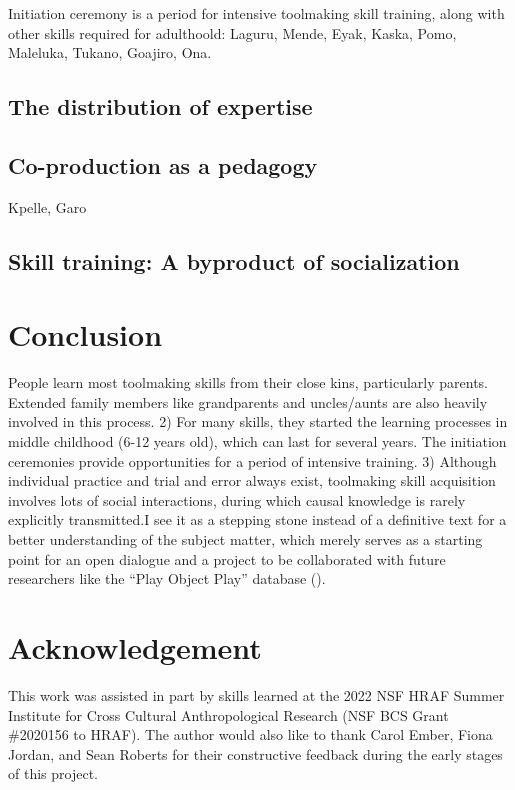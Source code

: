 \documentclass[
  11pt,
]{article}
\begin{document}
Initiation ceremony is a period for intensive toolmaking skill training, along with other skills required for adulthoold: Laguru, Mende, Eyak, Kaska, Pomo, Maleluka, Tukano, Goajiro, Ona.

\subsection{The distribution of expertise}\label{the-distribution-of-expertise}

\subsection{Co-production as a pedagogy}\label{co-production-as-a-pedagogy}

Kpelle, Garo

\subsection{Skill training: A byproduct of socialization}\label{skill-training-a-byproduct-of-socialization}

\section{Conclusion}\label{conclusion}

People learn most toolmaking skills from their close kins, particularly parents. Extended family members like grandparents and uncles/aunts are also heavily involved in this process. 2) For many skills, they started the learning processes in middle childhood (6-12 years old), which can last for several years. The initiation ceremonies provide opportunities for a period of intensive training. 3) Although individual practice and trial and error always exist, toolmaking skill acquisition involves lots of social interactions, during which causal knowledge is rarely explicitly transmitted.I see it as a stepping stone instead of a definitive text for a better understanding of the subject matter, which merely serves as a starting point for an open dialogue and a project to be collaborated with future researchers like the ``Play Object Play'' database ().

\section{Acknowledgement}\label{acknowledgement}

This work was assisted in part by skills learned at the 2022 NSF HRAF Summer Institute for Cross Cultural Anthropological Research (NSF BCS Grant \#2020156 to HRAF). The author would also like to thank Carol Ember, Fiona Jordan, and Sean Roberts for their constructive feedback during the early stages of this project.
\end{document}
